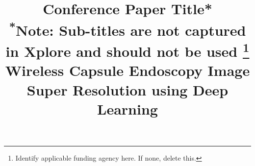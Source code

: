 \documentclass[conference]{IEEEtran}
\begin{document}
\title{Conference Paper Title*\\
{\footnotesize \textsuperscript{*}Note: Sub-titles are not captured in Xplore and
should not be used}
\thanks{Identify applicable funding agency here. If none, delete this.}
}

\title{Wireless Capsule Endoscopy Image Super Resolution using Deep Learning}
\maketitle
\end{document}
